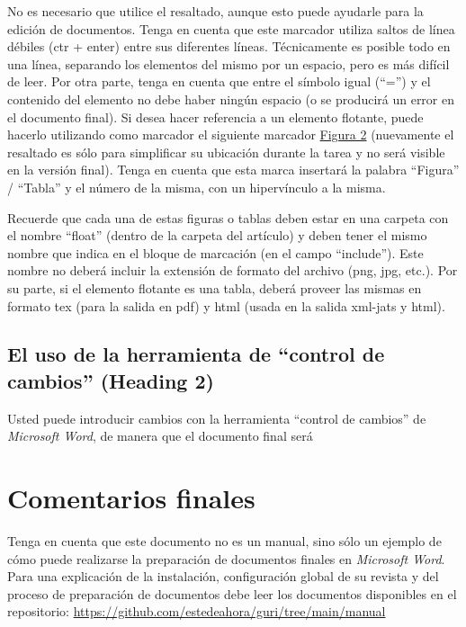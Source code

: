 \documentclass[
    a4paper,%
    DIV=calc,%
    abstract=true%
  ]{scrartcl}%
\begin{document}
  No es necesario que utilice el resaltado, aunque esto puede ayudarle
  para la edición de documentos. Tenga en cuenta que este marcador
  utiliza saltos de línea débiles (ctr + enter) entre sus diferentes
  líneas. Técnicamente es posible todo en una línea, separando los
  elementos del mismo por un espacio, pero es más difícil de leer. Por
  otra parte, tenga en cuenta que entre el símbolo igual (``='') y el
  contenido del elemento no debe haber ningún espacio (o se producirá un
  error en el documento final). Si desea hacer referencia a un elemento
  flotante, puede hacerlo utilizando como marcador el siguiente marcador
  \hyperref[FIG_02]{Figura 2} (nuevamente el resaltado es sólo para
  simplificar su ubicación durante la tarea y no será visible en la
  versión final). Tenga en cuenta que esta marca insertará la palabra
  ``Figura'' / ``Tabla'' y el número de la misma, con un hipervínculo a
  la misma.

  Recuerde que cada una de estas figuras o tablas deben estar en una
  carpeta con el nombre ``float'' (dentro de la carpeta del artículo) y
  deben tener el mismo nombre que indica en el bloque de marcación (en
  el campo ``include''). Este nombre no deberá incluir la extensión de
  formato del archivo (png, jpg, etc.). Por su parte, si el elemento
  flotante es una tabla, deberá proveer las mismas en formato tex (para
  la salida en pdf) y html (usada en la salida xml-jats y html).

  \subsection{El uso de la herramienta de ``control de cambios''
  (Heading
  2)}\label{el-uso-de-la-herramienta-de-control-de-cambios-heading-2}

  Usted puede introducir cambios con la herramienta ``control de
  cambios'' de \emph{Microsoft Word}, de manera que el documento final
  será

  \section{Comentarios finales}\label{comentarios-finales}

  Tenga en cuenta que este documento no es un manual, sino sólo un
  ejemplo de cómo puede realizarse la preparación de documentos finales
  en \emph{Microsoft Word}. Para una explicación de la instalación,
  configuración global de su revista y del proceso de preparación de
  documentos debe leer los documentos disponibles en el repositorio:
  \url{https://github.com/estedeahora/guri/tree/main/manual}
\end{document}
